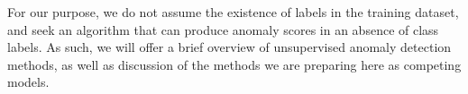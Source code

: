 For our purpose, we do not assume the existence of labels in the training dataset, and seek an
  algorithm that can produce anomaly scores in an absence of class labels. As such, we will offer
  a brief overview of unsupervised anomaly detection methods, as well as discussion of the methods
  we are preparing here as competing models.









